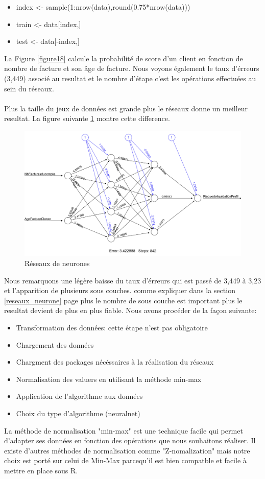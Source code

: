 \documentclass[11pt,a4paper]{report}
\begin{document}
\begin{itemize}
\item index <- sample(1:nrow(data),round(0.75*nrow(data)))
\item train <- data[index,]
\item test <- data[-index,]
\end{itemize}
La Figure \ref{figure18} calcule la probabilité de score d'un client en fonction de nombre de facture et son âge de facture. Nous voyons également le taux d'érreurs (3,449) associé au resultat  et le nombre d'étape c'est les opérations effectuées au sein du réseaux. \\\\
Plus la taille du jeux de données est grande plus le réseaux donne un meilleur resultat. La figure suivante \ref{neural2} montre cette difference. 
\newpage
\begin{figure}[h]
   \includegraphics[scale=0.45]{neural2.png}
     \caption{Réseaux de neurones}
     \label{neural2}
\end{figure}

Nous remarquons une légère baisse du taux d'érreurs qui est passé de 3,449 à 3,23 et l'apparition de plusieurs sous couches.
comme expliquer dans la section \ref{reseaux_neurone} page \pageref{reseaux_neurone} plus le nombre de sous couche est important plus le resultat devient de plus en plus fiable. 
Nous avons procéder de la façon suivante: 
\begin{itemize}
\item Transformation des données: cette étape n'est pas obligatoire 
\item Chargement des données 
\item Chargment des packages nécéssaires à la réalisation du réseaux
\item Normalisation des valuers en utilisant la méthode min-max
\item Application de l'algorithme aux données 
\item Choix du type d'algorithme (neuralnet)
\end{itemize}
 La méthode de normalisation "min-max" est une technique facile qui permet d'adapter ses données en fonction des opérations que nous souhaitons réaliser. Il existe d'autres méthodes de normalisation comme "Z-nomalization" mais notre choix est porté sur celui de Min-Max parcequ'il est bien compatble et facile à mettre en place sous R. 
 
\end{document}
